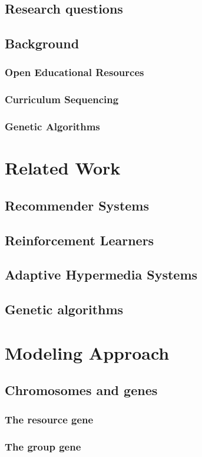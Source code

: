 \documentclass{book}
\begin{document}
\section{Research questions}
\section{Background}
\subsection{Open Educational Resources}
\subsection{Curriculum Sequencing}
\subsection{Genetic Algorithms}
\chapter{Related Work}
\section{Recommender Systems}
\section{Reinforcement Learners}
\section{Adaptive Hypermedia Systems}
\section{Genetic algorithms}
\chapter{Modeling Approach}
\section{Chromosomes and genes}
\subsection{The resource gene}
\subsection{The group gene}
\end{document}
